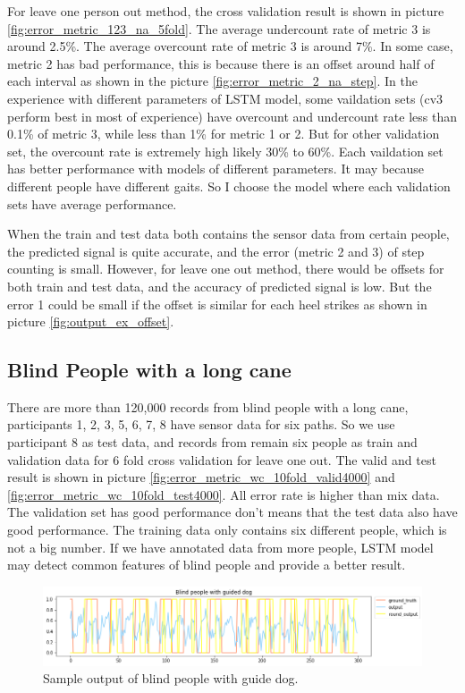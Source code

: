 \documentclass[11pt]{article}
\begin{document}
{For leave one person out method, the cross validation result is shown in picture \ref{fig:error_metric_123_na_5fold}.
The average undercount rate of metric 3 is around 2.5\%. The average overcount rate of metric 3 is around 7\%.
 In some case, metric 2 has bad performance, this is because there is an offset around half of each interval as shown in the picture  \ref{fig:error_metric_2_na_step}. 
 In the experience with different parameters of LSTM model,  some vaildation sets (cv3 perform best in most of experience) have overcount and undercount rate less than 0.1\% of metric 3, while less than 1\% for metric 1 or 2. But for other validation set, the overcount rate is extremely high likely 30\% to 60\%. Each vaildation set has better performance with models of different parameters. It may because different people have different gaits. So I choose the model where each validation sets have average performance. 

When the train and test data both contains the sensor data from certain people,  the predicted signal is quite accurate, and the error (metric 2 and 3) of step counting is small. However, for leave one out method, there would be offsets for both train and test data, and the accuracy of predicted signal is low. But the error 1 could be small if the offset is similar for each heel strikes as shown in picture \ref{fig:output_ex_offset}. 

\subsection{Blind People with a long cane}
There are more than 120,000 records from blind people with a long cane, participants 1, 2, 3, 5, 6, 7, 8 have sensor data for six paths. So we use participant 8 as test data, and records from remain six people as train and validation data for 6 fold cross validation for leave one out. The valid and test result is shown in picture \ref{fig:error_metric_wc_10fold_valid4000} and \ref{fig:error_metric_wc_10fold_test4000}. All error rate is higher than mix data. The validation set has good performance don't means that the test data also have good performance.
The training data only contains six different people, which is not a big number. If we have annotated data from more people, LSTM model may detect common features of blind people and provide a better result.

\begin{figure}[ht]
\centering
\includegraphics[scale=0.5]{blind_gd}
\caption{Sample output of blind people with guide dog.}
\label{fig:blind_gd}
\end{figure}


}
\end{document}
